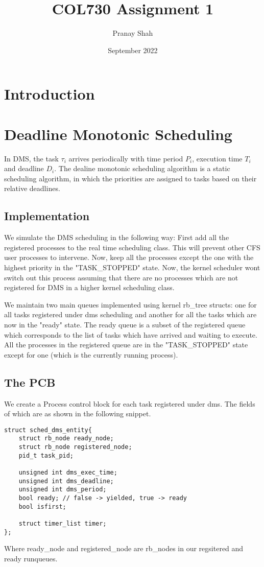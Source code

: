 \documentclass[12pt, letterpaper]{article}
\title{\textbf{COL730 Assignment 1}}
\author{Pranay Shah}
\date{September 2022}
\begin{document}

\section{Introduction}
\section{Deadline Monotonic Scheduling}
In DMS, the task $\tau_i$ arrives periodically with time period $P_i$, execution time $T_i$ and deadline $D_i$. The dealine monotonic scheduling algorithm is a static scheduling algorithm, in which the 
priorities are assigned to tasks based on their relative deadlines. 
\subsection{Implementation}
We simulate the DMS scheduling in the following way:
First add all the registered processes to the real time scheduling class. This will prevent other CFS user processes to intervene. Now, keep all the processes except the one with the highest priority in the 
"TASK\_STOPPED" state. Now, the kernel scheduler wont switch out this process assuming that there are no processes which are not registered for DMS in a higher kernel scheduling class.

We maintain two main queues implemented using kernel {\ttfamily rb\_tree} structs: one for all tasks registered under dms scheduling and another for all the tasks which are now in the "ready" state. The
ready queue is a subset of the registered queue which corresponds to the list of tasks which have arrived and waiting to execute. All the processes in the registered queue are in the "TASK\_STOPPED" state except for one (which is the currently running process).

\subsection{The PCB}
We create a Process control block for each task registered under dms. The fields of which are as shown in the following snippet.
\begin{lstlisting}
struct sched_dms_entity{
    struct rb_node ready_node;
    struct rb_node registered_node;
    pid_t task_pid;

    unsigned int dms_exec_time;
    unsigned int dms_deadline;
    unsigned int dms_period;
    bool ready; // false -> yielded, true -> ready
    bool isfirst;

    struct timer_list timer;
};
\end{lstlisting}
Where {\ttfamily ready\_node} and {\ttfamily registered\_node} are {\ttfamily rb\_node}s in our regsitered and ready runqueues. 
\end{document}
